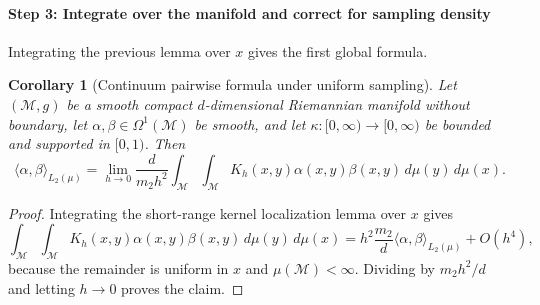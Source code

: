\documentclass[a4paper,11pt, DIV=10]{scrartcl}
\numberwithin{equation}{section}
\newtheorem{corollary}[theorem]{Corollary}
\theoremstyle{definition}
\theoremstyle{remark}
\newcommand{\mc}[1]{\mathcal{#1}}
\begin{document}
\paragraph{Step 3: Integrate over the manifold and correct for sampling density}
Integrating the previous lemma over $x$ gives the first global formula.

\begin{corollary}[Continuum pairwise formula under uniform sampling]
Let $(\mc{M},g)$ be a smooth compact $d$-dimensional Riemannian manifold without boundary, let $\alpha,\beta\in \Omega^1(\mc{M})$ be smooth, and let $\kappa\colon [0,\infty)\to [0,\infty)$ be bounded and supported in $[0,1)$. Then
\begin{equation}
\langle \alpha,\beta\rangle_{L_2(\mu)}
=
\lim_{h\to 0}
\frac{d}{m_2h^2}
\int_{\mc{M}}\int_{\mc{M}}
K_h(x,y)\alpha(x,y)\beta(x,y)\,d\mu(y)\,d\mu(x).
\end{equation}
\end{corollary}
\begin{proof}
Integrating the short-range kernel localization lemma over $x$ gives
\begin{equation}
\int_{\mc{M}}\int_{\mc{M}}
K_h(x,y)\alpha(x,y)\beta(x,y)\,d\mu(y)\,d\mu(x)
=
h^2\frac{m_2}{d}\langle \alpha,\beta\rangle_{L_2(\mu)}+O(h^4),
\end{equation}
because the remainder is uniform in $x$ and $\mu(\mc{M})<\infty$. Dividing by $m_2h^2/d$ and letting $h\to 0$ proves the claim.
\end{proof}
\end{document}
